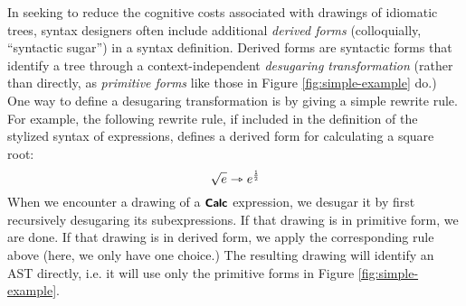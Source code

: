 In seeking to reduce the cognitive costs associated with drawings of idiomatic trees, syntax designers  often  include additional \emph{derived forms} (colloquially, ``syntactic sugar'') in a syntax definition.  Derived forms are syntactic forms that identify a tree through a context-independent \emph{desugaring transformation} (rather than directly, as \emph{primitive forms} like those in Figure \ref{fig:simple-example} do.) One way to define a desugaring transformation is by giving a simple rewrite rule. For example, the following rewrite rule, if included in the definition of the stylized syntax of expressions, defines a derived form for calculating a square root:
\begin{equation}\label{rule:simplelang-sqrt}
\sqrt{e} \rightarrowtriangle e^{\frac{\numintro{1}}{\numintro{2}}}
\end{equation}
When we encounter a drawing of a $\textsf{\textbf{\small Calc}}$ expression, we desugar  it by first recursively desugaring its subexpressions. If that drawing is in primitive form, we are done.  If that drawing is in derived form, we apply the corresponding rule above (here, we only have one choice.) The resulting drawing will identify an AST directly, i.e. it will use only the primitive forms in Figure \ref{fig:simple-example}.

